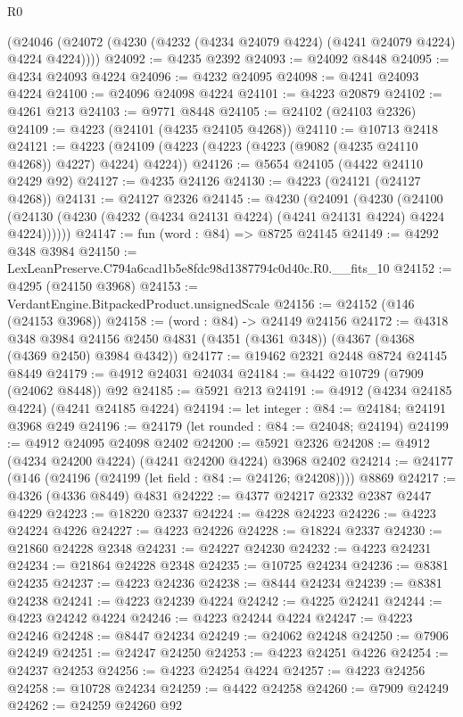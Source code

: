 \begin{lexlean}{R0}
\begin{coremodule}
    (@24046 (@24072 (@4230 (@4232 (@4234 @24079 @4224) (@4241 @24079 @4224) @4224 @4224))))
@24092 := @4235 @2392
@24093 := @24092 @8448
@24095 := @4234 @24093 @4224
@24096 := @4232 @24095
@24098 := @4241 @24093 @4224
@24100 := @24096 @24098 @4224
@24101 := @4223 @20879
@24102 := @4261 @213
@24103 := @9771 @8448
@24105 := @24102 (@24103 @2326)
@24109 := @4223 (@24101 (@4235 @24105 @4268))
@24110 := @10713 @2418
@24121 := @4223 (@24109 (@4223 (@4223 (@4223 (@9082 (@4235 @24110 @4268)) @4227) @4224) @4224))
@24126 := @5654 @24105 (@4422 @24110 @2429 @92)
@24127 := @4235 @24126
@24130 := @4223 (@24121 (@24127 @4268))
@24131 := @24127 @2326
@24145 := @4230
    (@24091
      (@4230
        (@24100 (@24130 (@4230 (@4232 (@4234 @24131 @4224) (@4241 @24131 @4224) @4224 @4224))))))
@24147 := fun (word : @84) => @8725 @24145
@24149 := @4292 @348 @3984
@24150 := LexLeanPreserve.C794a6cad1b5e8fdc98d1387794c0d40c.R0.__fits_10
@24152 := @4295 (@24150 @3968)
@24153 := VerdantEngine.BitpackedProduct.unsignedScale
@24156 := @24152 (@146 (@24153 @3968))
@24158 := (word : @84) -> @24149 @24156
@24172 := @4318
    @348
    @3984
    @24156
    @2450
    @4831
    (@4351 (@4361 @348))
    (@4367 (@4368 (@4369 @2450) @3984 @4342))
@24177 := @19462 @2321 @2448 @8724 @24145 @8449
@24179 := @4912 @24031 @24034
@24184 := @4422 @10729 (@7909 (@24062 @8448)) @92
@24185 := @5921 @213
@24191 := @4912 (@4234 @24185 @4224) (@4241 @24185 @4224)
@24194 := let integer : @84 := @24184; @24191 @3968 @249
@24196 := @24179 (let rounded : @84 := @24048; @24194)
@24199 := @4912 @24095 @24098 @2402
@24200 := @5921 @2326
@24208 := @4912 (@4234 @24200 @4224) (@4241 @24200 @4224) @3968 @2402
@24214 := @24177 (@146 (@24196 (@24199 (let field : @84 := @24126; @24208)))) @8869
@24217 := @4326 (@4336 @8449) @4831
@24222 := @4377 @24217 @2332 @2387 @2447 @4229
@24223 := @18220 @2337
@24224 := @4228 @24223
@24226 := @4223 @24224 @4226
@24227 := @4223 @24226
@24228 := @18224 @2337
@24230 := @21860 @24228 @2348
@24231 := @24227 @24230
@24232 := @4223 @24231
@24234 := @21864 @24228 @2348
@24235 := @10725 @24234
@24236 := @8381 @24235
@24237 := @4223 @24236
@24238 := @8444 @24234
@24239 := @8381 @24238
@24241 := @4223 @24239 @4224
@24242 := @4225 @24241
@24244 := @4223 @24242 @4224
@24246 := @4223 @24244 @4224
@24247 := @4223 @24246
@24248 := @8447 @24234
@24249 := @24062 @24248
@24250 := @7906 @24249
@24251 := @24247 @24250
@24253 := @4223 @24251 @4226
@24254 := @24237 @24253
@24256 := @4223 @24254 @4224
@24257 := @4223 @24256
@24258 := @10728 @24234
@24259 := @4422 @24258
@24260 := @7909 @24249
@24262 := @24259 @24260 @92

\end{coremodule}
\end{lexlean}
